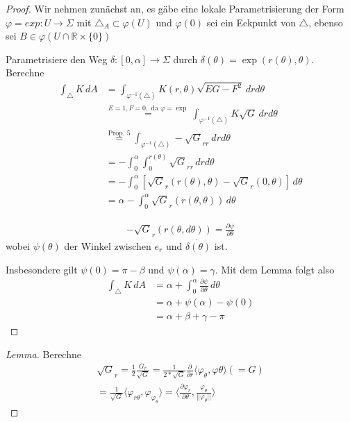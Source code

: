 \documentclass[../main.tex]{subfiles}
\begin{document}
\begin{proof}
    Wir nehmen zunächst an, es gäbe eine lokale Parametrisierung der Form
    \(\varphi = exp : U \to \Sigma\) mit \(\triangle_A \subset \varphi(U)\)
    und \(\varphi(0)\) sei ein Eckpunkt von $\triangle$, ebenso sei $B \in \varphi (U\cap \mathbb{R} \times \{0\})$


Parametrisiere den Weg $\delta : [0,\alpha] \to \Sigma$ durch $\delta(\theta) = \exp(r(\theta), \theta)$. Berechne
\begin{align*}
    \int_{\triangle} K \,dA & = \int_{\varphi^{-1}(\triangle)} K(r,\theta) \sqrt{EG-F^{2}}\,drd\theta \\
    & \overset{E=1, F=0, \text{ da } \varphi = \exp}{=}\int_{\varphi^{-1}(\triangle)} K\sqrt{G}  \,drd\theta \\ 
    & \overset{\text{Prop. 5}}{=} \int_{\varphi^{-1}(\triangle)} -\sqrt{G}_{rr} \ drd\theta \\
    & = - \int_{0}^{\alpha} \int_{0}^{r(\theta)} \sqrt{G}_{rr}\,drd\theta \\
    & = - \int_{0}^{\alpha} \left [\sqrt{G}_r (r(\theta), \theta) - \sqrt{G}_r(0,\theta) \right ] \,d\theta \\
    & = \alpha - \int_{0}^{\alpha} \sqrt{G}_r (r(\theta,\theta))  \,d\theta 
\end{align*}

\begin{lemma}
    \begin{align*}
        -\sqrt{G}_r (r(\theta, d\theta)) = \frac{\partial \psi}{\partial \theta}
    \end{align*} wobei $\psi(\theta)$ der Winkel zwischen $e_r$ und $\dot{\delta(\theta)}$ ist.
\end{lemma}
Insbesondere gilt $\psi (0) = \pi - \beta $ und $\psi (\alpha) = \gamma$. Mit dem Lemma folgt also
\begin{align*}
    \int_{\triangle} K  \,dA &= \alpha + \int_{0}^{\alpha} \frac{\partial \psi}{\partial \theta} \,d\theta \\
    &= \alpha + \psi(\alpha) - \psi(0) \\
    &= \alpha + \beta + \gamma - \pi
\end{align*}
\end{proof}

\begin{proof}[Lemma]
    Berechne 
    \begin{align*}
        \sqrt{G}_r = \frac{1}{2} \frac{G_r}{\sqrt{G}} = \frac{1}{2*\sqrt{G}} \frac{\partial}{\partial r} \langle \varphi_{\theta} , \varphi{\theta} \rangle (=G) \\
        = \frac{1}{\sqrt{G}} \langle \varphi_{r\theta}, \varphi_{\varphi_\theta} \rangle = \langle \frac{\partial \varphi _r}{\partial \theta} , \frac{\varphi_{\theta}}{||\varphi _{\theta}||} \rangle
    \end{align*}
\end{proof}
\end{document}
